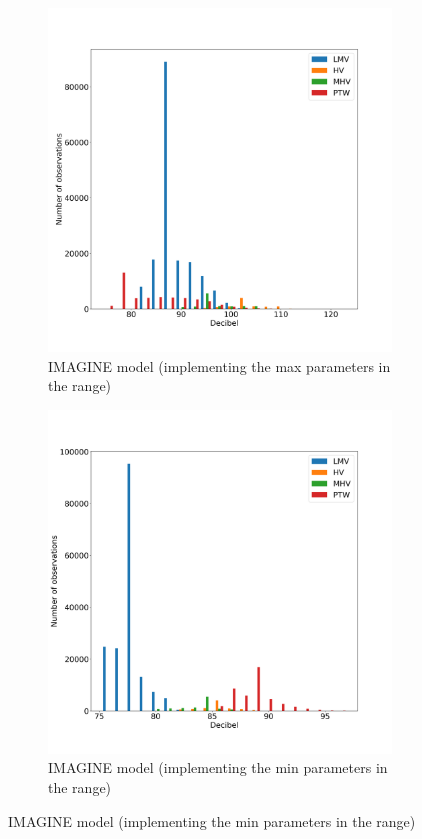 \documentclass{article}
\begin{document}
\begin{figure}[h]
\begin{subfigure}{.5\textwidth}
  \centering
  \includegraphics[width=.8\linewidth]{IMAGINE model max.png}  
  \caption{IMAGINE model (implementing the max parameters in the range)}
  \label{fig:sub-first}
\end{subfigure}
\begin{subfigure}{.5\textwidth}
  \centering
  \includegraphics[width=.8\linewidth]{IMAGINE model min.png}  
  \caption{IMAGINE model (implementing the min parameters in the range)}
  \label{fig:sub-second}
\end{subfigure}


\end{figure}
\end{document}
